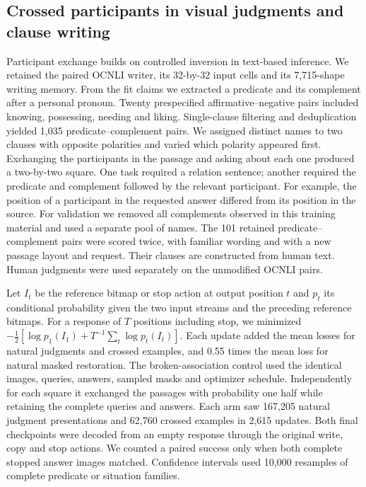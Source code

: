 \documentclass[12pt,a4paper]{article}
\providecommand{\DIFadd}[1]{{\protect\color{blue} \sf #1}} %
\begin{document}
\subsection*{\DIFadd{Crossed participants in visual judgments and clause writing}}
\DIFadd{Participant exchange builds on controlled inversion in text-based inference\cite{rolemin}. We retained the paired OCNLI writer, its 32-by-32 input cells and its 7,715-shape writing memory. From the fit claims we extracted a predicate and its complement after a personal pronoun. Twenty prespecified affirmative--negative pairs included knowing, possessing, needing and liking. Single-clause filtering and deduplication yielded 1,035 predicate--complement pairs. We assigned distinct names to two clauses with opposite polarities and varied which polarity appeared first. Exchanging the participants in the passage and asking about each one produced a two-by-two square. One task required a relation sentence; another required the predicate and complement followed by the relevant participant. For example, the position of a participant in the requested answer differed from its position in the source. For validation we removed all complements observed in this training material and used a separate pool of names. The 101 retained predicate--complement pairs were scored twice, with familiar wording and with a new passage layout and request. Their clauses are constructed from human text. Human judgments were used separately on the unmodified OCNLI pairs.
}

\DIFadd{Let $I_t$ be the reference bitmap or stop action at output position $t$ and $p_t$ its conditional probability given the two input streams and the preceding reference bitmaps. For a response of $T$ positions including stop, we minimized $-\tfrac12[\log p_1(I_1)+T^{-1}\sum_t\log p_t(I_t)]$. Each update added the mean losses for natural judgments and crossed examples, and 0.55 times the mean loss for natural masked restoration. The broken-association control used the identical images, queries, answers, sampled masks and optimizer schedule. Independently for each square it exchanged the passages with probability one half while retaining the complete queries and answers. Each arm saw 167,205 natural judgment presentations and 62,760 crossed examples in 2,615 updates. Both final checkpoints were decoded from an empty response through the original write, copy and stop actions. We counted a paired success only when both complete stopped answer images matched. Confidence intervals used 10,000 resamples of complete predicate or situation families.
}
\end{document}
